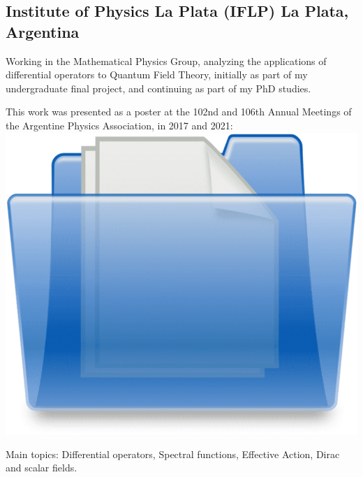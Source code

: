 \subsection{{Institute of Physics La Plata (IFLP) \hfill La Plata, Argentina}}
\begin{zitemize}
\item Working in the Mathematical Physics Group, analyzing the applications of differential operators to Quantum Field Theory, initially as part of my undergraduate final project, and continuing as part of my PhD studies.
\item This work was presented as a poster at the 102nd and 106th Annual Meetings of the Argentine Physics Association, in 2017 and 2021: \href{https://drive.google.com/drive/folders/1NhlFmvg1QMwYczq2GqnXWXXOQsxqrctO?usp=sharing}{\includegraphics[scale=0.01]{folder.png}}
\item Main topics: Differential operators, Spectral functions, Effective Action, Dirac and scalar fields.
\end{zitemize}

